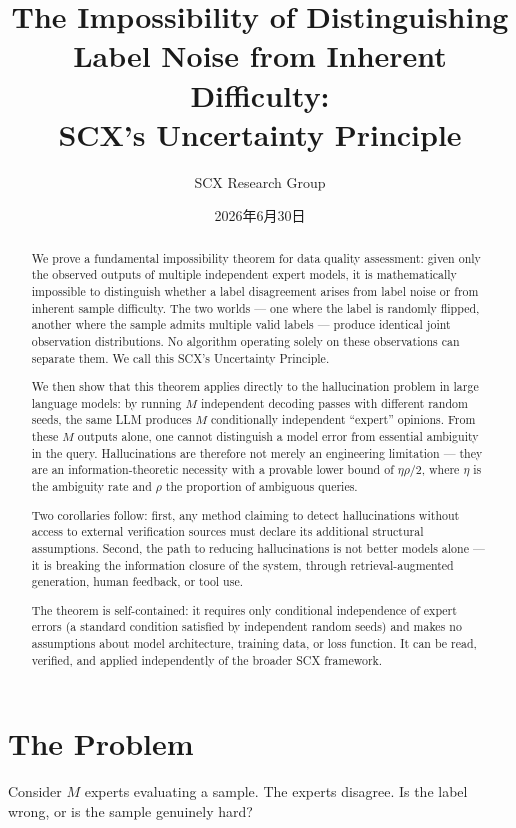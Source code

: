 \documentclass[12pt,a4paper]{ctexart}
\title{The Impossibility of Distinguishing Label Noise from Inherent Difficulty:\\SCX's Uncertainty Principle}
\author{SCX Research Group}
\date{2026年6月30日}
\theoremstyle{definition}
\theoremstyle{remark}
\begin{document}
\maketitle

\begin{abstract}
We prove a fundamental impossibility theorem for data quality assessment: given only the observed outputs of multiple independent expert models, it is mathematically impossible to distinguish whether a label disagreement arises from label noise or from inherent sample difficulty. The two worlds — one where the label is randomly flipped, another where the sample admits multiple valid labels — produce identical joint observation distributions. No algorithm operating solely on these observations can separate them. We call this SCX's Uncertainty Principle.

We then show that this theorem applies directly to the hallucination problem in large language models: by running $M$ independent decoding passes with different random seeds, the same LLM produces $M$ conditionally independent ``expert'' opinions. From these $M$ outputs alone, one cannot distinguish a model error from essential ambiguity in the query. Hallucinations are therefore not merely an engineering limitation — they are an information-theoretic necessity with a provable lower bound of $\eta\rho/2$, where $\eta$ is the ambiguity rate and $\rho$ the proportion of ambiguous queries.

Two corollaries follow: first, any method claiming to detect hallucinations without access to external verification sources must declare its additional structural assumptions. Second, the path to reducing hallucinations is not better models alone — it is breaking the information closure of the system, through retrieval-augmented generation, human feedback, or tool use.

The theorem is self-contained: it requires only conditional independence of expert errors (a standard condition satisfied by independent random seeds) and makes no assumptions about model architecture, training data, or loss function. It can be read, verified, and applied independently of the broader SCX framework.
\end{abstract}

\section{The Problem}

Consider $M$ experts evaluating a sample. The experts disagree. Is the label wrong, or is the sample genuinely hard?
\end{document}
